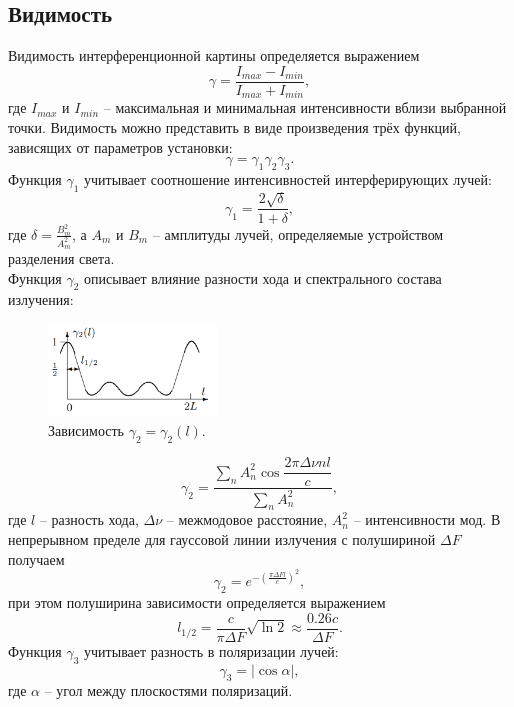 \documentclass[a4paper]{article}
\begin{document}
\subsection*{Видимость}
Видимость интерференционной картины определяется выражением
\begin{equation}
\gamma = \dfrac{I_{max} - I_{min}}{I_{max} + I_{min}},
\end{equation}
где $I_{max}$ и $I_{min}$ – максимальная и минимальная интенсивности вблизи выбранной точки. Видимость можно представить в виде произведения трёх функций, зависящих от параметров установки:
$$
\gamma = \gamma_1 \gamma_2 \gamma_3.
$$
Функция $\gamma_1$ учитывает соотношение интенсивностей интерферирующих лучей:
\begin{equation}
\gamma_1 = \dfrac{2\sqrt{\delta}}{1+\delta},
\end{equation}
где $\delta = \frac{B_m^2}{A_m^2}$, а $A_m$ и $B_m$ – амплитуды лучей, определяемые устройством разделения света.\\
Функция $\gamma_2$ описывает влияние разности хода и спектрального состава излучения:
\begin{figure}
\begin{center}
\includegraphics[width=0.4\textwidth]{1.png}
\vspace{-20pt}
\end{center}
\caption{Зависимость $\gamma_2 = \gamma_2(l)$.}
\end{figure}
$$
\gamma_2 = \dfrac{\sum\limits_n A^2_n \cos \dfrac{2\pi \Delta \nu n l}{c}}{\sum\limits_n A_n^2},
$$
где $l$ – разность хода, $\Delta \nu$ – межмодовое расстояние, $A_n^2$ – интенсивности мод. В непрерывном пределе для гауссовой линии излучения с полушириной $\Delta F$ получаем
$$
\gamma_2 = e^{-\left(\frac{\pi \Delta F l}{c}\right)^2},
$$
при этом полуширина зависимости определяется выражением
\begin{equation}
l_{1/2} = \dfrac{c}{\pi \Delta F}\sqrt{\ln 2} \approx \dfrac{0.26 c}{\Delta F}.
\end{equation}
Функция $\gamma_3$ учитывает разность в поляризации лучей:
\begin{equation}
\gamma_3 = |\cos \alpha|,
\end{equation}
где $\alpha$ – угол между плоскостями поляризаций.
\end{document}
